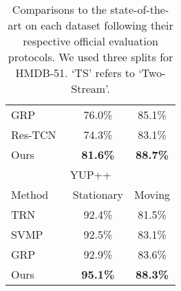 \documentclass[runningheads]{llncs}
\begin{document}
\begin{table}[t]
{\begin{tabular}{lcc}
GRP   ~\cite{grp}             & 76.0\%                            & 85.1\%                         \\
Res-TCN~\cite{soo2017interpretable}            & 74.3\%                            & 83.1\%                         \\\hline
Ours               & \textbf{81.6\%}                   & \textbf{88.7\%}                \\\hline
\multicolumn{3}{c}{YUP++}                                                               \\\hline
Method             & \multicolumn{1}{c}{Stationary}    & \multicolumn{1}{c}{Moving}     \\\hline
TRN~\cite{feichtenhofer2017temporal}                  & 92.4\%                            & 81.5\%                         \\
SVMP~\cite{wang2018video}               & 92.5\%                            & 83.1\%                         \\
GRP~\cite{grp}                 & 92.9\%                            & 83.6\%                         \\\hline
Ours               & \textbf{95.1\%}                   & \textbf{88.3\%}                \\\hline
\end{tabular}}
\caption{Comparisons to the state-of-the-art on each dataset following their respective official evaluation protocols. We used three splits for HMDB-51. `TS' refers to `Two-Stream'.}
\label{table:2}
\end{table}
\end{document}
